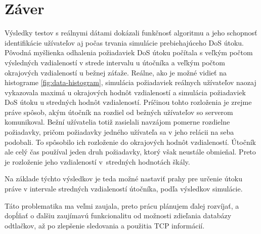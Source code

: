 \documentclass[
  digital, %
  oneside, %
  table,   %
  lof,     %
  nolot,   %
  nocover
]{fithesis3}
\begin{document}
\chapter{Záver}
Výsledky testov s reálnymi dátami dokázali funkčnosť algoritmu a jeho schopnosť
identifikácie užívateľov aj počas trvania simulácie prebiehajúceho DoS útoku.
Pôvodná myšlienka
odhalenia požiadaviek DoS útoku počítala s veľkým počtom výsledných
vzdialeností v strede intervalu u útočníka a veľkým počtom okrajových vzdialeností u bežnej záťaže. 
Reálne, ako je možné vidieť na histograme \ref{fig:data-histogram},
simulácia požiadaviek reálnych užívateľov naozaj vykazovala maximá u okrajových hodnôt
vzdialeností a simulácia požiadaviek DoS útoku u stredných hodnôt vzdialeností. 
Príčinou tohto rozloženia je zrejme práve spôsob, akým útočník na rozdiel od
bežných užívateľov so serverom komunikoval. Bežní užívatelia totiž zasielali
navzájom pomerne rozdielne požiadavky, pričom požiadavky jedného užívateľa sa v jeho
relácii na seba podobali. To spôsobilo ich rozloženie do okrajových hodnôt
vzdialeností. Útočník ale celý čas používal jeden druh požiadavky, ktorý však
neustále obmieňal. Preto je rozloženie jeho vzdialeností v~stredných hodnotách
škály. 

Na základe týchto výsledkov je teda možné nastaviť prahy pre určenie útoku
práve v intervale stredných vzdialeností útočníka, podľa výsledkov simulácie.

Táto problematika ma veľmi zaujala, preto prácu plánujem ďalej rozvíjať,
a dopĺňať o ďalšiu zaujímavú funkcionalitu od možnosti zdieľania
databázy odtlačkov, až po zlepšenie sledovania a použitia TCP informácií.

\printbibliography
{} 

\makeatletter\thesis@blocks@clear\makeatother
{} %
\printindex

\appendix %
\end{document}
